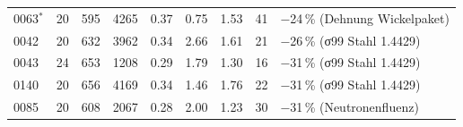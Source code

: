 \begin{tabular}{@{}lrrrrrrrl@{}}
0063$^\ast$ & 20 & \num{595} & \num{4265} & \num{0.37} & \num{0.75} & \num{1.53} & \num{41} & \num{-24}\,\% (Dehnung Wickelpaket) \\
0042 & 20 & \num{632} & \num{3962} & \num{0.34} & \num{2.66} & \num{1.61} & \num{21} & \num{-26}\,\% (σ99 Stahl 1.4429) \\
0043 & 24 & \num{653} & \num{1208} & \num{0.29} & \num{1.79} & \num{1.30} & \num{16} & \num{-31}\,\% (σ99 Stahl 1.4429) \\
0140 & 20 & \num{656} & \num{4169} & \num{0.34} & \num{1.46} & \num{1.76} & \num{22} & \num{-31}\,\% (σ99 Stahl 1.4429) \\
0085 & 20 & \num{608} & \num{2067} & \num{0.28} & \num{2.00} & \num{1.23} & \num{30} & \num{-31}\,\% (Neutronenfluenz) \\
\bottomrule\end{tabular}
